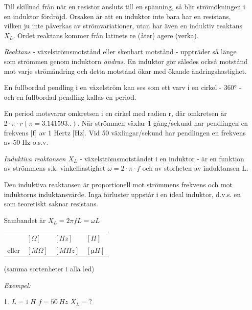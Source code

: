Till skillnad från när en resistor ansluts till en spänning, så blir
strömökningen i en induktor fördröjd. Orsaken är att en induktor inte bara har
en resistans, vilken ju inte påverkas av strömvariationer, utan har även en
induktiv reaktans \(X_L\). Ordet reaktans kommer från latinets re (åter) agere
(verka).

\emph{Reaktans} - växelströmsmotstånd eller skenbart motstånd - uppträder så
länge som strömmen genom induktorn \emph{ändras}. En induktor gör således också
motstånd mot varje strömändring och detta motstånd ökar med ökande
ändringshastighet.

En fullbordad pendling i en växelström kan ses som ett varv i en cirkel - 360° -
och en fullbordad pendling kallas en period.

En period motsvarar omkretsen i en cirkel med radien r, där omkretsen är
\(2 \cdot π \cdot r (π = 3.141593..)\). När strömmen växlar 1 gång/sekund har
pendlingen en frekvens [f] av 1 Hertz [Hz]. Vid 50 växlingar/sekund har
pendlingen en frekvens av 50 Hz o.s.v.

\emph{Induktiva reaktansen \(X_L\)} - växelströmsmotståndet i en induktor - är
en funktion av strömmens s.k. vinkelhastighet \(\omega = 2 \cdot π \cdot f\) och
av storheten av induktansen L.

Den induktiva reaktansen är proportionell mot strömmens frekvens och mot
induktorns induktansvärde. Inga förluster uppstår i en ideal induktor, d.v.s. en
som teoretiskt saknar resistans.

Sambandet är
\(X_L = 2πfL = \omega L\)



\begin{tabular}{llll}
  &  \([\Omega]\) & \([Hz]\) & \([H]\)    \\
  eller & \([M\Omega]\) & \([MHz]\) & \([µH]\)
\end{tabular}

(samma sortenheter i alla led)


\emph{Exempel:}

1. \(L = 1\ H\) \(f = 50\ Hz\) \(X_L = ?\)

